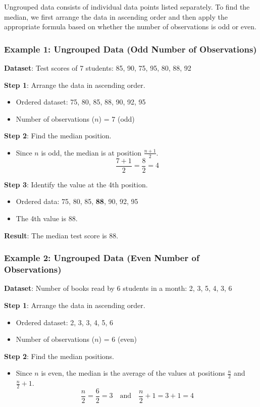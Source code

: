 \documentclass[11pt]{article}
\begin{document}
Ungrouped data consists of individual data points listed separately. To find the median, we first arrange the data in ascending order and then apply the appropriate formula based on whether the number of observations is odd or even.

\subsubsection*{Example 1: Ungrouped Data (Odd Number of Observations)}
\textbf{Dataset}: Test scores of 7 students: 85, 90, 75, 95, 80, 88, 92

\textbf{Step 1}: Arrange the data in ascending order.
\begin{itemize}
    \item Ordered dataset: 75, 80, 85, 88, 90, 92, 95
    \item Number of observations ($n$) = 7 (odd)
\end{itemize}

\textbf{Step 2}: Find the median position.
\begin{itemize}
    \item Since $n$ is odd, the median is at position $\frac{n+1}{2}$.
    \[
    \frac{7+1}{2} = \frac{8}{2} = 4
    \]
\end{itemize}

\textbf{Step 3}: Identify the value at the 4th position.
\begin{itemize}
    \item Ordered data: 75, 80, 85, \textbf{88}, 90, 92, 95
    \item The 4th value is 88.
\end{itemize}

\textbf{Result}: The median test score is 88.

\subsubsection*{Example 2: Ungrouped Data (Even Number of Observations)}
\textbf{Dataset}: Number of books read by 6 students in a month: 2, 3, 5, 4, 3, 6

\textbf{Step 1}: Arrange the data in ascending order.
\begin{itemize}
    \item Ordered dataset: 2, 3, 3, 4, 5, 6
    \item Number of observations ($n$) = 6 (even)
\end{itemize}

\textbf{Step 2}: Find the median positions.
\begin{itemize}
    \item Since $n$ is even, the median is the average of the values at positions $\frac{n}{2}$ and $\frac{n}{2} + 1$.
    \[
    \frac{n}{2} = \frac{6}{2} = 3 \quad \text{and} \quad \frac{n}{2} + 1 = 3 + 1 = 4
    \]
\end{itemize}
\end{document}
